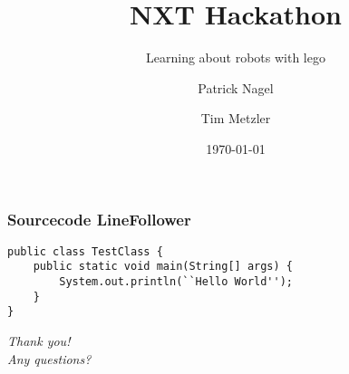 \documentclass{beamer}
\begin{document}
\title{NXT Hackathon}
\subtitle{Learning about robots with lego}
\author
{Patrick Nagel \and Tim Metzler }
\date{\today} %
\subject{Computer Science}
\frame{\titlepage} 
 
 

\begin{frame}[fragile] %
\frametitle{Sourcecode LineFollower}
\begin{lstlisting}
public class TestClass {
	public static void main(String[] args) {
		System.out.println(``Hello World'');
	}
}
\end{lstlisting}
\end{frame}

\begin{frame}{}
  \centering \Large
  \emph{\vspace{1em}Thank you!\\Any questions?}
\end{frame}
 
\end{document}
